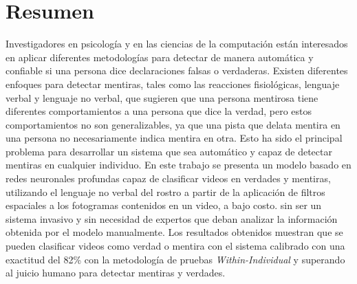 \chapter*{\centering Resumen}

Investigadores en psicología y en las ciencias de la computación están interesados en aplicar diferentes metodologías para detectar de manera automática y confiable si una persona dice declaraciones falsas o verdaderas.
Existen diferentes enfoques para detectar mentiras, tales como las reacciones fisiológicas, lenguaje verbal y lenguaje no verbal, que sugieren que una persona mentirosa tiene diferentes comportamientos a una persona que dice la verdad, pero estos comportamientos no son generalizables, ya que una pista que delata mentira en una persona no necesariamente indica mentira en otra. Esto ha sido el principal problema para desarrollar un sistema que sea automático y capaz de detectar mentiras en cualquier individuo. En este trabajo se presenta un modelo basado en redes neuronales profundas capaz de clasificar videos en verdades y mentiras, utilizando el lenguaje no verbal del rostro a partir de la aplicación de filtros espaciales a los fotogramas contenidos en un video, a bajo costo. sin ser un sistema invasivo y sin necesidad de expertos que deban analizar la información obtenida por el modelo manualmente. Los resultados obtenidos muestran que se pueden clasificar videos como verdad o mentira con el sistema calibrado con una exactitud del 82\% con la metodología de pruebas \textit{Within-Individual} y superando al juicio humano para detectar mentiras y verdades.\\
